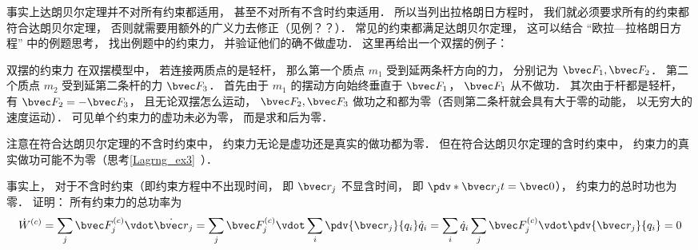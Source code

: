 事实上达朗贝尔定理并不对所有约束都适用， 甚至不对所有不含时约束适用． 所以当列出拉格朗日方程时， 我们就必须要求所有的约束都符合达朗贝尔定理， 否则就需要用额外的广义力去修正（见例？？）． 常见的约束都满足达朗贝尔定理， 这可以结合 “欧拉—拉格朗日方程” 中的例题思考， 找出例题中的约束力， 并验证他们的确不做虚功． 这里再给出一个双摆的例子：

\begin{example}{双摆的约束力}
在双摆模型中， 若连接两质点的是轻杆， 那么第一个质点 $m_1$ 受到延两条杆方向的力， 分别记为 $\bvec F_1, \bvec F_2$． 第二个质点 $m_2$ 受到延第二条杆的力 $\bvec F_3$． 首先由于 $m_1$ 的摆动方向始终垂直于 $\bvec F_1$， $\bvec F_1$ 从不做功． 其次由于杆都是轻杆， 有 $\bvec F_2 = -\bvec F_3$， 且无论双摆怎么运动， $\bvec F_2, \bvec F_3$ 做功之和都为零（否则第二条杆就会具有大于零的动能， 以无穷大的速度运动）． 可见单个约束力的虚功未必为零， 而是求和后为零．
\end{example}

注意在符合达朗贝尔定理的不含时约束中， 约束力无论是虚功还是真实的做功都为零． 但在符合达朗贝尔定理的含时约束中， 约束力的真实做功可能不为零（思考\autoref{Lagrng_ex3}~）．

事实上， 对于不含时约束（即约束方程中不出现时间， 即 $\bvec r_j$ 不显含时间， 即 $\pdv*{\bvec r_j}{t} = \bvec 0$）， 约束力的总时功也为零． 证明： 所有约束力的总功率为
\begin{equation}
\dot W^{(c)} = \sum_j \bvec F_j^{(c)} \vdot \dot {\bvec r}_j = \sum_j \bvec F_j^{(c)} \vdot \sum_i \pdv{\bvec r_j}{q_i} \dot q_i = \sum_i \dot q_i \sum_j \bvec F_j^{(c)} \vdot \pdv{\bvec r_j}{q_i} = 0
\end{equation}
